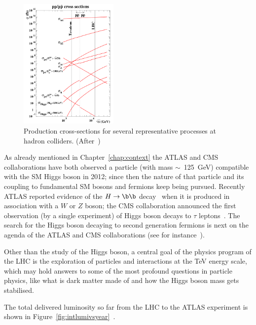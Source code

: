 \begin{figure}[!htbp]
\centering
\includegraphics[width=0.43\textwidth]{sec1_cross_lhc.png}
\caption{\label{fig:sec1_cross_lhc}Production cross-sections for several representative processes at hadron colliders. (After~\cite{Weiglein:2004hn})}
\end{figure}

As already mentioned in Chapter~\ref{chap:context}
the ATLAS and CMS collaborations have both observed a particle (with mass $\sim$~125~GeV) 
compatible with the SM Higgs boson in 2012; 
since then the nature of that particle and its coupling to fundamental SM bosons and fermions 
keep being pursued.  Recently ATLAS reported evidence of the $H\to\b\b$ decay~\cite{ATLASHbb2017} 
when it is produced in association with a $W$ or $Z$ boson; the CMS collaboration announced 
the first observation (by a single experiment)
 of Higgs boson decays to $\tau$ leptons~\cite{CMSHtautau2017}. 
The search for the Higgs boson decaying to second generation fermions is next on the 
agenda of the ATLAS and CMS collaborations (see for instance~\cite{ATLASHmumu2017}).

Other than the study of the Higgs boson,
 a central goal of the physics program of the LHC is the exploration of particles and 
interactions at the TeV energy scale, which may hold answers to some of the most profound questions in 
particle physics, like what is dark matter made of and how the Higgs boson mass gets stabilised.

The total delivered luminosity so far from the LHC to the ATLAS experiment  is shown in 
Figure~\ref{fig:intlumivsyear}~\cite{ATLASLumi}.

